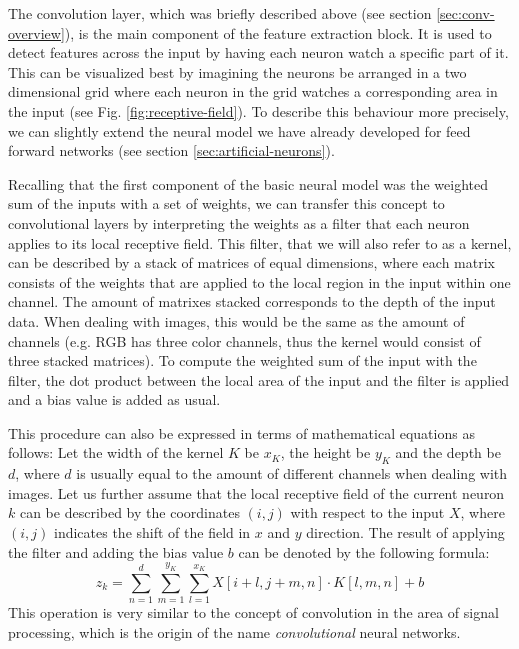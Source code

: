The convolution layer, which was briefly described above (see section
\ref{sec:conv-overview}), is the main
component of the feature extraction block. It is used to detect
features across the input by having each neuron watch a specific part
of it. This can be visualized best by imagining the neurons be
arranged in a two dimensional grid where each neuron in the grid
watches a corresponding area in the input (see
Fig. \ref{fig:receptive-field}). To describe
this behaviour more precisely, we can slightly extend the neural model
we have already developed for feed forward networks (see section
\ref{sec:artificial-neurons}).

Recalling that the first component of the basic neural model was the
weighted sum of the inputs with a set of weights, we can transfer this
concept to convolutional layers by interpreting the weights as a
filter that each neuron applies to its local receptive field. This
filter, that we will also refer to as a kernel, can be described by a
stack of matrices of equal dimensions, where each matrix consists of
the weights that are applied to the local region in the input within
one channel. The amount of matrixes stacked corresponds to the depth
of the input data. When dealing with images, this would be the same as
the amount of channels (e.g. RGB has three color channels, thus the
kernel would consist of three stacked matrices). To compute the
weighted sum of the input with the filter, the dot product between the
local area of the input and the filter is applied and a bias value is
added as usual.

This procedure can also be expressed in terms of mathematical
equations as follows: Let the width of the kernel \(K\) be \(x_K\), the
height be \(y_K\) and the depth be \(d\), where \(d\) is usually equal
to the amount of different channels when dealing with images. Let us
further assume that the local receptive field of the current neuron
\(k\) can be described by the coordinates \((i, j)\) with respect to
the input \(X\), where \((i, j)\) indicates the shift of the field in
\(x\) and \(y\) direction. The result of applying the filter and
adding the bias value \(b\) can be denoted by the following formula:
\begin{equation}
  \label{Eq:convolution}
  z_k = \sum_{n=1}^{d}{\sum_{m=1}^{y_K}{\sum_{l=1}^{x_K}{X[i+l, j+m, n] \cdot
        K[l, m, n]}}} + b
\end{equation}
This operation is very similar to the concept of convolution in the
area of signal processing, which is the origin of the name
\textit{convolutional} neural networks.

